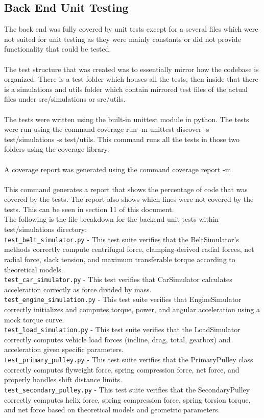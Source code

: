 \documentclass[12pt, titlepage]{article}
\begin{document}
\subsection{Back End Unit Testing}
The back end was fully covered by unit tests except for a several files which were not suited for unit testing as they were mainly constants or did not provide functionality that could be tested. \\
\\
The test structure that was created was to essentially mirror how the codebase is organized. There is a test folder which houses all the tests, then inside that there is a simulations and utils folder which contain mirrored test files of the actual files under src/simulations or src/utils.\\
\\
The tests were written using the built-in unittest module in python. The tests were run using the command coverage run -m unittest discover -s test/simulations -s test/utils. This command runs all the tests in those two folders using the coverage library.\\
\\
A coverage report was generated using the command coverage report -m.\\
\\
This command generates a report that shows the percentage of code that was covered by the tests. The report also shows which lines were not covered by the tests.
This can be seen in section 11 of this document.\\

\noindent The following is the file breakdown for the backend unit tests within test/simulations directory:
\\
\texttt{test\_belt\_simulator.py} - This test suite verifies that the BeltSimulator’s methods correctly compute centrifugal force, clamping-derived radial forces, net radial force, slack tension, and maximum transferable torque according to theoretical models.
\\
\texttt{test\_car\_simulator.py} - This test verifies that CarSimulator calculates acceleration correctly as force divided by mass.
\\
\texttt{test\_engine\_simulation.py} - This test suite verifies that EngineSimulator correctly initializes and computes torque, power, and angular acceleration using a mock torque curve.
\\
\texttt{test\_load\_simulation.py} - This test suite verifies that the LoadSimulator correctly computes vehicle load forces (incline, drag, total, gearbox) and acceleration given specific parameters.
\\
\texttt{test\_primary\_pulley.py} - This test suite verifies that the PrimaryPulley class correctly computes flyweight force, spring compression force, net force, and properly handles shift distance limits.
\\
\texttt{test\_secondary\_pulley.py} - This test suite verifies that the SecondaryPulley correctly computes helix force, spring compression force, spring torsion torque, and net force based on theoretical models and geometric parameters. 
\\
\end{document}
